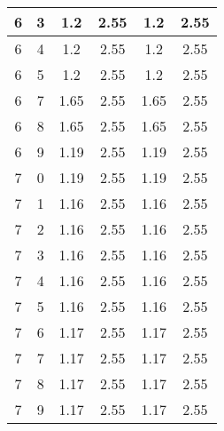 \begin{longtable}{|c|c||c||c||c|c|}
	6 & 3 & 1.2 & 2.55 & 1.2 & 2.55 \\ \hline
	6 & 4 & 1.2 & 2.55 & 1.2 & 2.55 \\ \hline
	6 & 5 & 1.2 & 2.55 & 1.2 & 2.55 \\ \hline
	6 & 7 & 1.65 & 2.55 & 1.65 & 2.55 \\ \hline
	6 & 8 & 1.65 & 2.55 & 1.65 & 2.55 \\ \hline
	6 & 9 & 1.19 & 2.55 & 1.19 & 2.55 \\ \hline
	7 & 0 & 1.19 & 2.55 & 1.19 & 2.55 \\ \hline
	7 & 1 & 1.16 & 2.55 & 1.16 & 2.55 \\ \hline
	7 & 2 & 1.16 & 2.55 & 1.16 & 2.55 \\ \hline
	7 & 3 & 1.16 & 2.55 & 1.16 & 2.55 \\ \hline
	7 & 4 & 1.16 & 2.55 & 1.16 & 2.55 \\ \hline
	7 & 5 & 1.16 & 2.55 & 1.16 & 2.55 \\ \hline
	7 & 6 & 1.17 & 2.55 & 1.17 & 2.55 \\ \hline
	7 & 7 & 1.17 & 2.55 & 1.17 & 2.55 \\ \hline
	7 & 8 & 1.17 & 2.55 & 1.17 & 2.55 \\ \hline
	7 & 9 & 1.17 & 2.55 & 1.17 & 2.55 \\ \hline
\end{longtable}

